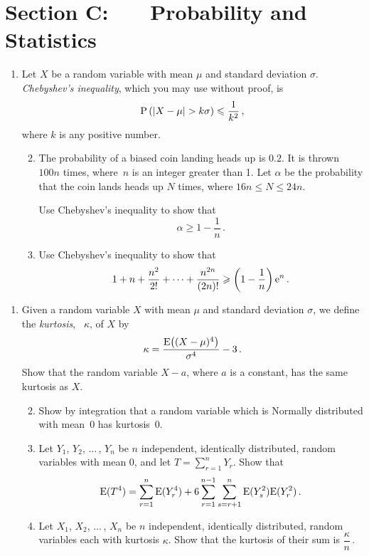 \documentclass[a4, 11pt]{report}
\newlength{\qspace}
\newcounter{qnumber}
\newenvironment{question}%
 {\vspace{\qspace}
  \begin{enumerate}[\bfseries 1\quad][10]%
    \setcounter{enumi}{\value{qnumber}}%
    \item%
 }
{
  \end{enumerate}
  \filbreak
  \stepcounter{qnumber}
 }
\newenvironment{questionparts}[1][1]%
 {
  \begin{enumerate}[\bfseries (i)]%
    \setcounter{enumii}{#1}
    \addtocounter{enumii}{-1}
    \setlength{\itemsep}{5mm}
    \setlength{\parskip}{8pt}
 }
 {
  \end{enumerate}
 }
\def\e{{\rm e}}
\def\E{{\rm E}}
\def\P{{\rm P}}
\def\le{\leqslant}
\def\ge{\geqslant}
\begin{document}
\section*{Section C: \ \ \ Probability and Statistics}
\begin{question}
Let $X$ be a random variable with mean $\mu$ and standard deviation 
$\sigma$. {\em Chebyshev's inequality}, which you may use without proof,
is 
\[
\P\left(\vert X-\mu\vert > k\sigma\right) \le \frac 1 {k^2}
\,,
\]
where $k$ is any positive number.
\begin{questionparts}
\item

The probability of a biased coin landing heads up is $0.2$. It 
is thrown $100n$ times,  where~$n $ is an integer greater than 1. 
Let $\alpha $ be the probability that
the coin lands heads up $N$ times,  where  $16n \le N \le 24n$.

Use Chebyshev's inequality to show that
\[
\alpha \ge  1-\frac 1n
\,.
\]
\item
Use Chebyshev's inequality to show that
\[
1+ n + \frac{n^2}{ 2!} + \cdots + \frac {n^{2n}}{(2n)!} \ge 
\left(1-\frac1n\right)  \e^n
\,.
\]
\end{questionparts}

\end{question}




\begin{question}

Given a random variable $X$
 with mean $\mu$ and standard deviation $\sigma$, 
we define the {\em kurtosis},~ $\kappa$, of $X$
by
\[
\kappa = \frac{ \E\big((X-\mu)^4\big)}{\sigma^4} -3 \,.
\]
Show 
that the random variable $X-a$, where $a$ is a constant, has the same
kurtosis as $X$.

 

\begin{questionparts}   
\item
Show 
by integration
that a random variable which
is Normally distributed   with mean~0 has kurtosis~0.

\item Let $Y_1$, $Y_2$, $\ldots$\,, $Y_n$ be $n$ independent, identically 
distributed, random variables with mean 0, and let 
$T = \sum\limits_{r=1}^n Y_r$. Show that
\[
\E(T^4) =  \sum_{r=1}^n \E(Y_r^4) + 
6 \sum_{r=1}^{n-1}  \sum_{s=r+1}^{n} \E(Y^2_s)
\E(Y^2_r)
\,.
\]

\item
 Let $X_1$, $X_2$, $\ldots$\,, $X_n$ be $n$ independent, identically 
distributed, random variables each with kurtosis $\kappa$. Show that the
kurtosis of their sum is $\dfrac\kappa n\,$.

\end{questionparts}

\end{question}
\end{document}
